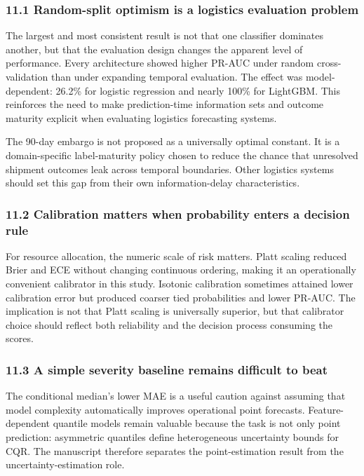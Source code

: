 \documentclass[
]{article}
\begin{document}
\subsubsection{11.1 Random-split optimism is a logistics evaluation
problem}\label{random-split-optimism-is-a-logistics-evaluation-problem}

The largest and most consistent result is not that one classifier
dominates another, but that the evaluation design changes the apparent
level of performance. Every architecture showed higher PR-AUC under
random cross-validation than under expanding temporal evaluation. The
effect was model-dependent: 26.2\% for logistic regression and nearly
100\% for LightGBM. This reinforces the need to make prediction-time
information sets and outcome maturity explicit when evaluating logistics
forecasting systems.

The 90-day embargo is not proposed as a universally optimal constant. It
is a domain-specific label-maturity policy chosen to reduce the chance
that unresolved shipment outcomes leak across temporal boundaries. Other
logistics systems should set this gap from their own information-delay
characteristics.

\subsubsection{11.2 Calibration matters when probability enters a
decision
rule}\label{calibration-matters-when-probability-enters-a-decision-rule}

For resource allocation, the numeric scale of risk matters. Platt
scaling reduced Brier and ECE without changing continuous ordering,
making it an operationally convenient calibrator in this study. Isotonic
calibration sometimes attained lower calibration error but produced
coarser tied probabilities and lower PR-AUC. The implication is not that
Platt scaling is universally superior, but that calibrator choice should
reflect both reliability and the decision process consuming the scores.

\subsubsection{11.3 A simple severity baseline remains difficult to
beat}\label{a-simple-severity-baseline-remains-difficult-to-beat}

The conditional median's lower MAE is a useful caution against assuming
that model complexity automatically improves operational point
forecasts. Feature-dependent quantile models remain valuable because the
task is not only point prediction: asymmetric quantiles define
heterogeneous uncertainty bounds for CQR. The manuscript therefore
separates the point-estimation result from the uncertainty-estimation
role.
\end{document}
